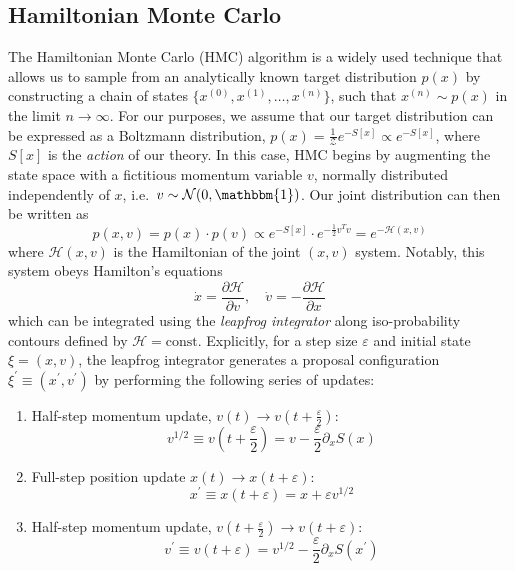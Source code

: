 \documentclass{article} %
\begin{document}
\subsection{\label{sec:hamiltonian_dynamics}Hamiltonian Monte Carlo}
%
The Hamiltonian Monte Carlo (HMC) algorithm is a widely used technique that allows us to sample from an analytically
known target distribution \(p(x)\) by constructing a chain of states \(\{x^{(0)},
x^{(1)}, \ldots, x^{(n)}\}\), such that \(x^{(n)}\sim p(x)\) in the limit
\(n\rightarrow\infty\).
%
For our purposes, we assume that our target distribution can be expressed as a Boltzmann distribution, \(p(x) =
\tfrac{1}{\mathcal{Z}} e^{-S[x]}\propto e^{-S[x]}\), where \(S[x]\) is the \emph{action} of our
theory.
%
In this case, HMC begins by augmenting the state space with a fictitious momentum variable \(v\), normally
distributed independently of \(x\), i.e.\ \(v\sim\mathcal{N}(0, \mathbbm{1})\).
%
Our joint distribution can then be written as
%
\begin{equation}
   p(x, v) = p(x)\cdot p(v) \propto e^{-S[x]}\cdot e^{-\frac{1}{2}v^{T}v} = e^{-\mathcal{H}(x, v)}
\end{equation}
%
where \(\mathcal{H}(x, v)\) is the Hamiltonian of the joint \((x, v)\) system.
%
Notably, this system obeys Hamilton's equations
%
\begin{equation}
   \dot{x} = \frac{\partial\mathcal{H}}{\partial v},\quad \dot{v} = -\frac{\partial\mathcal{H}}{\partial x}
\end{equation}
%
which can be integrated using the \emph{leapfrog integrator} along iso-probability contours defined by \(\mathcal{H} =
\text{const}\).
%
Explicitly, for a step size \(\varepsilon\) and initial state \(\xi = (x, v)\), the leapfrog integrator generates a
proposal configuration \(\xi^{\prime} \equiv (x^{\prime}, v^{\prime})\) by performing the following series of updates: 
%
\begin{enumerate}
   \item Half-step momentum update, \(v(t)\rightarrow v(t+\frac{\varepsilon}{2})\):
      \begin{equation}
         v^{1/2} \equiv v{\left(t+\frac{\varepsilon}{2}\right)} = v-\frac{\varepsilon}{2}\partial_{x}S(x)
         \label{eq:original_momentum_update}
      \end{equation}
   \item Full-step position update \(x(t)\rightarrow x(t+\varepsilon)\):
      \begin{equation}
         x^{\prime} \equiv x(t+\varepsilon) = x + \varepsilon v^{1/2}
         \label{eq:original_position_update}
      \end{equation}
   \item Half-step momentum update, \(v{\left(t+\frac{\varepsilon}{2}\right)}\rightarrow v(t+\varepsilon)\):
      \begin{equation}
         v^{\prime} \equiv v(t+\varepsilon) = v^{1/2} - \frac{\varepsilon}{2}\partial_{x} S(x^{\prime})
      \end{equation}
\end{enumerate}
\end{document}
